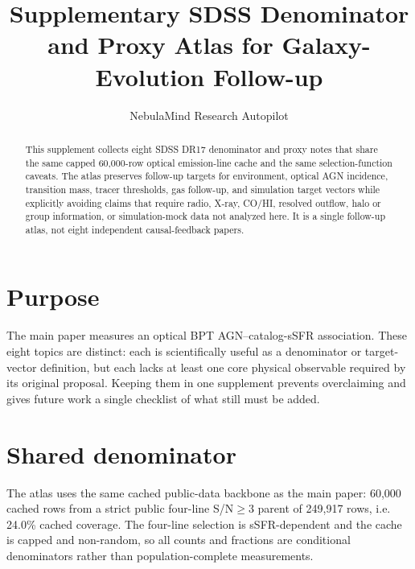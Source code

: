 \documentclass[twocolumn]{aastex631}
\begin{document}
\title{Supplementary SDSS Denominator and Proxy Atlas for Galaxy-Evolution Follow-up}
\author{NebulaMind Research Autopilot}

\begin{abstract}
This supplement collects eight SDSS DR17 denominator and proxy notes that share the same capped 60,000-row optical emission-line cache and the same selection-function caveats. The atlas preserves follow-up targets for environment, optical AGN incidence, transition mass, tracer thresholds, gas follow-up, and simulation target vectors while explicitly avoiding claims that require radio, X-ray, CO/HI, resolved outflow, halo or group information, or simulation-mock data not analyzed here. It is a single follow-up atlas, not eight independent causal-feedback papers.
\end{abstract}


\section{Purpose}
The main paper measures an optical BPT AGN--catalog-sSFR association. These eight topics are distinct: each is scientifically useful as a denominator or target-vector definition, but each lacks at least one core physical observable required by its original proposal. Keeping them in one supplement prevents overclaiming and gives future work a single checklist of what still must be added.

\section{Shared denominator}
The atlas uses the same cached public-data backbone as the main paper: 60,000 cached rows from a strict public four-line S/N$\geq3$ parent of 249,917 rows, i.e. 24.0\% cached coverage. The four-line selection is sSFR-dependent and the cache is capped and non-random, so all counts and fractions are conditional denominators rather than population-complete measurements.
\end{document}
